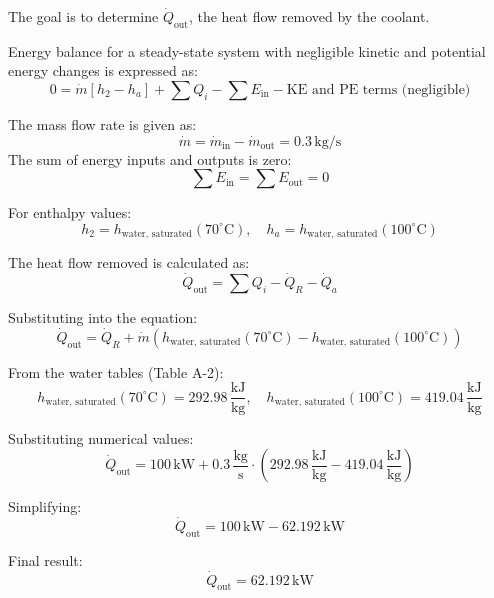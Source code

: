 The goal is to determine \( \dot{Q}_{\text{out}} \), the heat flow removed by the coolant.  

Energy balance for a steady-state system with negligible kinetic and potential energy changes is expressed as:  
\[
0 = \dot{m} \left[ h_2 - h_a \right] + \sum Q_i - \sum E_{\text{in}} - \text{KE and PE terms (negligible)}  
\]  

The mass flow rate is given as:  
\[
\dot{m} = \dot{m}_{\text{in}} - \dot{m}_{\text{out}} = 0.3 \, \text{kg/s}  
\]  
The sum of energy inputs and outputs is zero:  
\[
\sum E_{\text{in}} = \sum E_{\text{out}} = 0  
\]  

For enthalpy values:  
\[
h_2 = h_{\text{water, saturated}}(70^\circ\text{C}), \quad h_a = h_{\text{water, saturated}}(100^\circ\text{C})  
\]  

The heat flow removed is calculated as:  
\[
\dot{Q}_{\text{out}} = \sum Q_i - \dot{Q}_R - \dot{Q}_a  
\]  

Substituting into the equation:  
\[
\dot{Q}_{\text{out}} = \dot{Q}_R + \dot{m} \left( h_{\text{water, saturated}}(70^\circ\text{C}) - h_{\text{water, saturated}}(100^\circ\text{C}) \right)  
\]  

From the water tables (Table A-2):  
\[
h_{\text{water, saturated}}(70^\circ\text{C}) = 292.98 \, \frac{\text{kJ}}{\text{kg}}, \quad h_{\text{water, saturated}}(100^\circ\text{C}) = 419.04 \, \frac{\text{kJ}}{\text{kg}}  
\]  

Substituting numerical values:  
\[
\dot{Q}_{\text{out}} = 100 \, \text{kW} + 0.3 \, \frac{\text{kg}}{\text{s}} \cdot \left( 292.98 \, \frac{\text{kJ}}{\text{kg}} - 419.04 \, \frac{\text{kJ}}{\text{kg}} \right)  
\]  

Simplifying:  
\[
\dot{Q}_{\text{out}} = 100 \, \text{kW} - 62.192 \, \text{kW}  
\]  

Final result:  
\[
\dot{Q}_{\text{out}} = 62.192 \, \text{kW}  
\]
